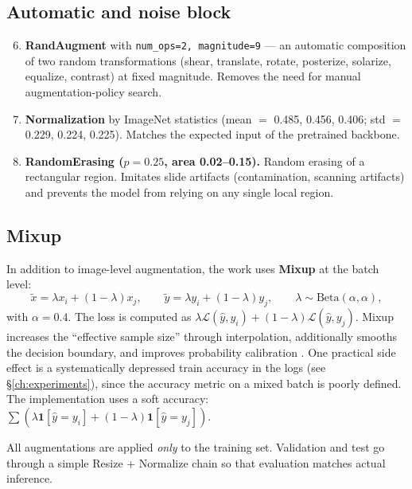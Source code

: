 \documentclass[14pt,a4paper]{extreport}
\begin{document}
\subsection{Automatic and noise block}

\begin{enumerate}
    \setcounter{enumi}{5}
    \item \textbf{RandAugment} \cite{cubuk2020randaugment} with
          \texttt{num\_ops=2, magnitude=9} --- an automatic composition
          of two random transformations (shear, translate, rotate,
          posterize, solarize, equalize, contrast) at fixed magnitude.
          Removes the need for manual augmentation-policy search.
    \item \textbf{Normalization} by ImageNet statistics (mean $=$ 0.485,
          0.456, 0.406; std $=$ 0.229, 0.224, 0.225). Matches the
          expected input of the pretrained backbone.
    \item \textbf{RandomErasing ($p=0.25$, area 0.02--0.15).} Random
          erasing of a rectangular region. Imitates slide artifacts
          (contamination, scanning artifacts) and prevents the model
          from relying on any single local region.
\end{enumerate}

\subsection{Mixup}

In addition to image-level augmentation, the work uses \textbf{Mixup}
\cite{zhang2018mixup} at the batch level:
\[
    \tilde{x} = \lambda x_i + (1-\lambda) x_j,
    \qquad
    \tilde{y} = \lambda y_i + (1-\lambda) y_j,
    \qquad
    \lambda \sim \text{Beta}(\alpha, \alpha),
\]
with $\alpha = 0.4$. The loss is computed as
$\lambda \mathcal{L}(\hat y, y_i) + (1-\lambda) \mathcal{L}(\hat y, y_j)$.
Mixup increases the ``effective sample size'' through interpolation,
additionally smooths the decision boundary, and improves probability
calibration \cite{zhang2018mixup}. One practical side effect is a
systematically depressed train accuracy in the logs
(see \S\ref{ch:experiments}), since the accuracy metric on a mixed batch
is poorly defined. The implementation uses a soft accuracy:
$\sum (\lambda \mathbf{1}[\hat y = y_i] + (1-\lambda) \mathbf{1}[\hat y = y_j])$.

All augmentations are applied \textit{only} to the training set.
Validation and test go through a simple Resize + Normalize chain so that
evaluation matches actual inference.
\end{document}
